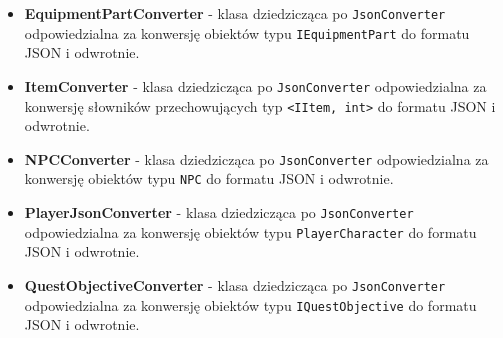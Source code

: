 \begin{itemize}
                \item \textbf{EquipmentPartConverter} - klasa dziedzicząca po \texttt{JsonConverter} odpowiedzialna za konwersję obiektów typu \texttt{IEquipmentPart} do formatu JSON i odwrotnie. 
                \item \textbf{ItemConverter} - klasa dziedzicząca po \texttt{JsonConverter} odpowiedzialna za konwersję słowników przechowujących typ \texttt{<IItem, int>} do formatu JSON i odwrotnie. 
                \item \textbf{NPCConverter} - klasa dziedzicząca po \texttt{JsonConverter} odpowiedzialna za konwersję obiektów typu \texttt{NPC} do formatu JSON i odwrotnie. 
                \item \textbf{PlayerJsonConverter} - klasa dziedzicząca po \texttt{JsonConverter} odpowiedzialna za konwersję obiektów typu \texttt{PlayerCharacter} do formatu JSON i odwrotnie. 
                \item \textbf{QuestObjectiveConverter} - klasa dziedzicząca po \texttt{JsonConverter} odpowiedzialna za konwersję obiektów typu \texttt{IQuestObjective} do formatu JSON i odwrotnie. 
                    
            




\end{itemize}


